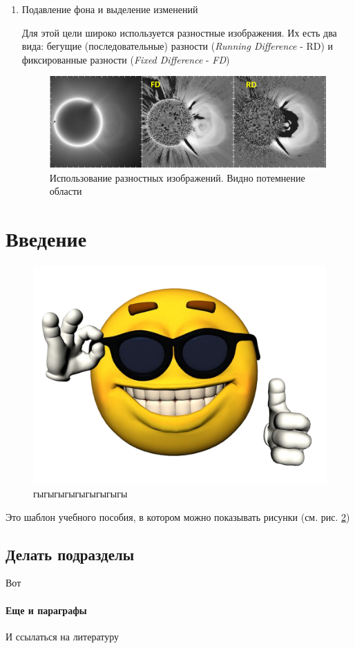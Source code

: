 \begin{enumerate}
\begin{enumerate}
		\item \textsf{Подавление фона и выделение изменений}

		Для этой цели широко используется разностные изображения. Их есть два вида: бегущие (последовательные) разности (\textit{Running Difference} - RD) и фиксированные разности (\textit{Fixed Difference} - \textit{FD})

		\begin{figure}[h!]
			\centering
			\includegraphics[width=0.7\linewidth]{images/grechnev8.png}
			\caption{Использование разностных изображений. Видно потемнение области }
			\label{grechnev8}
		\end{figure}

	\end{enumerate}
\end{enumerate}




\section{Введение}

\begin{figure}[H]
	\centering
	\includegraphics[scale=0.55]{img/smile.png}
	\caption{гыгыгыгыгыгыгыгыгы}
	\label{fig:gygygy}
\end{figure}

Это шаблон учебного пособия, в котором можно показывать рисунки (см. рис. \ref{fig:gygygy})

\subsection{Делать подразделы}
Вот

\paragraph{Еще и параграфы}
И ссылаться на литературу \cite{priest}

